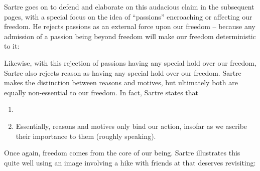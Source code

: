 Sartre goes on to defend and elaborate on this audacious claim in the subsequent pages, with a special focus on the idea of \enquote{passions} \autocite[581 -- 585]{sartre} encroaching or affecting our freedom. He rejects passions as an external force upon our freedom -- because any admission of a passion being beyond freedom will make our freedom deterministic to it: 

Likewise, with this rejection of passions having any special hold over our freedom, Sartre also rejects reason as having any special hold over our freedom. Sartre makes the distinction between reasons and motives, but ultimately both are equally non-essential to our freedom. In fact, Sartre states that 

\begin{enumerate}
  \item {}
  \item Essentially, reasons and motives only bind our action, insofar as we ascribe their importance to them (roughly speaking).
\end{enumerate}

\noindent
Once again, freedom comes from the core of our being. Sartre illustrates this quite well using an image involving a hike with friends at \autocite[595]{sartre} that deserves revisiting:

